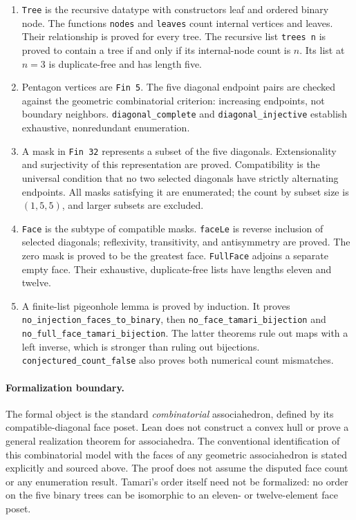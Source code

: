\documentclass[10pt]{article}
\begin{document}
\begin{enumerate}
\item \texttt{Tree} is the recursive datatype with constructors leaf and ordered binary node. The functions \texttt{nodes} and \texttt{leaves} count internal vertices and leaves. Their relationship is proved for every tree. The recursive list \texttt{trees n} is proved to contain a tree if and only if its internal-node count is $n$. Its list at $n=3$ is duplicate-free and has length five.
\item Pentagon vertices are \texttt{Fin 5}. The five diagonal endpoint pairs are checked against the geometric combinatorial criterion: increasing endpoints, not boundary neighbors. \texttt{diagonal\_complete} and \texttt{diagonal\_injective} establish exhaustive, nonredundant enumeration.
\item A mask in \texttt{Fin 32} represents a subset of the five diagonals. Extensionality and surjectivity of this representation are proved. Compatibility is the universal condition that no two selected diagonals have strictly alternating endpoints. All masks satisfying it are enumerated; the count by subset size is $(1,5,5)$, and larger subsets are excluded.
\item \texttt{Face} is the subtype of compatible masks. \texttt{faceLe} is reverse inclusion of selected diagonals; reflexivity, transitivity, and antisymmetry are proved. The zero mask is proved to be the greatest face. \texttt{FullFace} adjoins a separate empty face. Their exhaustive, duplicate-free lists have lengths eleven and twelve.
\item A finite-list pigeonhole lemma is proved by induction. It proves \texttt{no\_injection\_faces\_to\_binary}, then \texttt{no\_face\_tamari\_bijection} and \texttt{no\_full\_face\_tamari\_bijection}. The latter theorems rule out maps with a left inverse, which is stronger than ruling out bijections. \texttt{conjectured\_count\_false} also proves both numerical count mismatches.
\end{enumerate}

\paragraph{Formalization boundary.}
The formal object is the standard \emph{combinatorial} associahedron, defined by its compatible-diagonal face poset. Lean does not construct a convex hull or prove a general realization theorem for associahedra. The conventional identification of this combinatorial model with the faces of any geometric associahedron is stated explicitly and sourced above. The proof does not assume the disputed face count or any enumeration result. Tamari's order itself need not be formalized: no order on the five binary trees can be isomorphic to an eleven- or twelve-element face poset.
\end{document}

